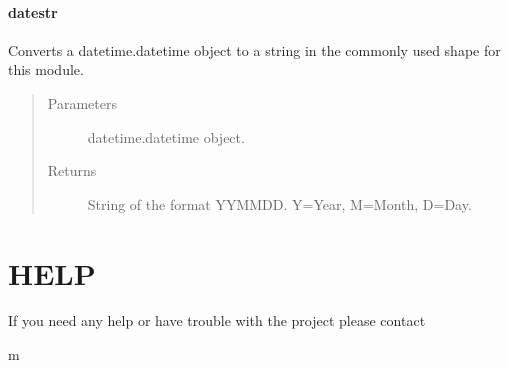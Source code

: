 \documentclass[letterpaper,10pt,english]{sphinxmanual}
\begin{document}
\subsubsection{datestr}
\label{\detokenize{generated/MPPy.tools.tools.datestr::doc}}\label{\detokenize{generated/MPPy.tools.tools.datestr:datestr}}

\begin{fulllineitems}
\label{\detokenize{generated/MPPy.tools.tools.datestr:MPPy.tools.tools.datestr}}
Converts a datetime.datetime object to a string in the commonly used shape for this module.
\begin{quote}\begin{description}
\item[{Parameters}] \leavevmode
{} \textendash{} datetime.datetime object.

\item[{Returns}] \leavevmode
String of the format YYMMDD. Y=Year, M=Month, D=Day.

\end{description}\end{quote}

\end{fulllineitems}



\chapter{HELP}
\label{\detokenize{help::doc}}\label{\detokenize{help:help}}
If you need any help or have trouble with the project please contact 


\renewcommand{\indexname}{Python Module Index}
\begin{sphinxtheindex}
\def\bigletter#1{{\Large\sffamily#1}\nopagebreak\vspace{1mm}}
\bigletter{m}
\item {}
\item {}
\end{sphinxtheindex}

\renewcommand{\indexname}{Index}
\printindex
\end{document}
